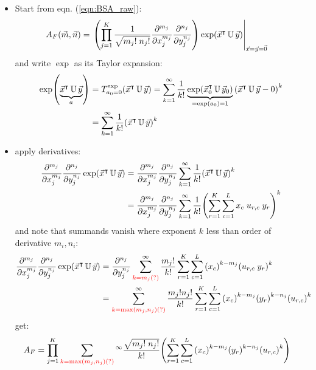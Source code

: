 \documentclass[
	english,
	a4paper,
	fontsize=10pt,
	parskip=half,
	titlepage=true,
	DIV=12,
	final
]{scrreprt}
\newcommand*{\transp}{\ensuremath{^\intercal}}
\begin{document}
\begin{itemize}
\item Start from eqn. (\ref{eqn:BSA_raw}):
\begin{align*}
	A_F(\vec{m}, \vec{n})
&=
	\eval{\qty(
		\prod_{j=1}^{K}
			\frac
				{1}
				{\sqrt{m_j! \; n_j!}}
			\pdv[m_j]{x_j}
			\pdv[n_j]{y_j}
		) \exp(\vec{x}\transp \, \mathbb{U} \, \vec{y})
	}_{\vec{x} = \vec{y} = \vec{0}}
\end{align*}
and write $\exp$ as its Taylor expansion:
\begin{align}
	\exp
	( \underbrace{\vec{x}\transp \, \mathbb{U} \, \vec{y}}_{a} )
&=
	T_{a_0 = 0}^{\exp} ( \vec{x}\transp \, \mathbb{U} \, \vec{y} )
=
	\sum_{k=1}^{\infty}
		\frac{1}{k!}
		\underbrace{ \exp( \vec{x}_0\transp \, \mathbb{U} \, \vec{y}_0 ) }_{=\exp(a_0) = 1}
		\qty( \vec{x}\transp \, \mathbb{U} \, \vec{y} - 0 )^{k}
	\\
&=
	\sum_{k=1}^{\infty}
		\frac{1}{k!}
		\qty( \vec{x}\transp \, \mathbb{U} \, \vec{y} )^{k}
\end{align}

\item apply derivatives:
\begin{align}
	\pdv[m_j]{x_j}
	\pdv[n_j]{y_j}
	\exp(\vec{x}\transp \, \mathbb{U} \, \vec{y})
&=
	\pdv[m_j]{x_j}
	\pdv[n_j]{y_j}
	\sum_{k=1}^{\infty}
		\frac{1}{k!}
		\qty( \vec{x}\transp \, \mathbb{U} \, \vec{y} )^{k}
	\\
&=
	\pdv[m_j]{x_j}
	\pdv[n_j]{y_j}
	\sum_{k=1}^{\infty}
		\frac{1}{k!}
		\qty( 
			\sum_{r=1}^{K}
			\sum_{c=1}^{L}
			x_c \; u_{r,c} \; y_r
		)^{k}
\end{align}
and note that summands vanish where exponent $k$ less than order of derivative $m_i, n_i$:
\begin{align}
	\pdv[m_j]{x_j}
	\pdv[n_j]{y_j}
	\exp(\vec{x}\transp \, \mathbb{U} \, \vec{y})
&=
	\pdv[n_j]{y_j}
	\sum^{\infty}_{\color{red} k=m_j (?)}
		\frac{m_j !}{k!}
			\sum_{r=1}^{K}
			\sum_{c=1}^{L}
		\qty(x_c)^{k - m_j}
		\qty(u_{r,c} \; y_r)^{k}
	\\
&=
	\sum^{\infty}_{\color{red} k=\max(m_j, n_j) (?)}
		\frac{m_j ! n_j !}{k!}
			\sum_{r=1}^{K}
			\sum_{c=1}^{L}
				\qty(x_c)^{k - m_j}
				\qty(y_r)^{k - n_j}
				\qty(u_{r,c})^{k}
\end{align}
get:
\begin{align}
	A_F
&=
	\prod_{j=1}^{K}
	\sum_{\color{red} k=\max(m_j, n_j) (?)}^{\infty}
		\frac
			{\sqrt{m_j! \; n_j!}}
			{k!}
		\qty( 
			\sum_{r=1}^{K}
			\sum_{c=1}^{L}
				\qty(x_c)^{k - m_j}
				\qty(y_r)^{k - n_j}
				\qty(u_{r,c})^{k}
		)
\end{align}


\end{itemize}
\end{document}
